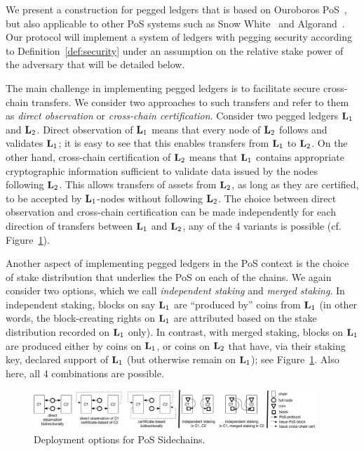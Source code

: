 We present a construction for pegged ledgers
that is based
on Ouroboros PoS~\cite{C:KRDO17}, but also applicable to other PoS
systems such as Snow White~\cite{DBLP:journals/iacr/BentovPS16a}
and Algorand~\cite{algorand}.
Our protocol
will implement a system of ledgers with pegging %
security
according to
Definition~\ref{def:security} under an assumption on the relative stake power of the
adversary that will be detailed below.

The main challenge in implementing pegged ledgers is to facilitate secure
cross-chain transfers.  We consider two approaches to such transfers and refer
to them as {\em direct observation} or {\em cross-chain certification}. Consider
two pegged ledgers $\mathbf{L}_1$ and $\mathbf{L}_2$.  Direct observation of $\mathbf{L}_1$ means that
every node of $\mathbf{L}_2$ follows and validates $\mathbf{L}_1$; it is easy to see that this
enables transfers from $\mathbf{L}_1$ to $\mathbf{L}_2$.  On the other hand, cross-chain
certification of $\mathbf{L}_2$ means that $\mathbf{L}_1$ contains appropriate cryptographic
information sufficient to validate data issued by the nodes following $\mathbf{L}_2$.
This allows transfers of assets from $\mathbf{L}_2$, as long as they are certified, to be
accepted by $\mathbf{L}_1$-nodes without following $\mathbf{L}_2$.
The choice between direct observation and cross-chain certification can be made
independently for each direction of transfers between $\mathbf{L}_1$ and $\mathbf{L}_2$, any of
the 4 variants is possible (cf. Figure~\ref{fig:sidechain-options}).

Another aspect of implementing pegged ledgers in the PoS context is the choice
of stake distribution that underlies the PoS on each of the chains.
We again consider two options, which we call  {\em independent
staking} and {\em merged staking}. In independent staking, blocks on
say $\mathbf{L}_1$ are ``produced by'' coins from $\mathbf{L}_1$ (in other words, the
block-creating rights on $\mathbf{L}_1$ are attributed based on the stake distribution
recorded on $\mathbf{L}_1$ only).
In contrast, with merged staking, blocks on $\mathbf{L}_1$ are
produced either by coins on $\mathbf{L}_1$, or coins on $\mathbf{L}_2$ that have, via their
staking key, declared support of $\mathbf{L}_1$ (but otherwise remain on $\mathbf{L}_1$); see
Figure~\ref{fig:sidechain-options}. Also here, all 4 combinations are possible.

\begin{figure}
\begin{center}
    \includegraphics[width=0.95\textwidth]{chapters/sidechains/figures/sidechains-options.png}
  \caption{Deployment options for PoS Sidechains.}
  \label{fig:sidechain-options}
  \end{center}
\end{figure}

